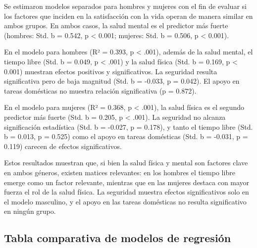 \documentclass[
  spanish,
  a4paper,
  oneside]{scrbook}
\begin{document}
Se estimaron modelos separados para hombres y mujeres con el fin de
evaluar si los factores que inciden en la satisfacción con la vida
operan de manera similar en ambos grupos. En ambos casos, la salud
mental es el predictor más fuerte (hombres: Std. b = 0.542, p
\textless{} 0.001; mujeres: Std. b = 0.506, p \textless{} 0.001).

En el modelo para hombres (R² = 0.393, p \textless{} .001), además de la
salud mental, el tiempo libre (Std. b = 0.049, p \textless{} .001) y la
salud física (Std. b = 0.169, p \textless{} 0.001) muestran efectos
positivos y significativos. La seguridad resulta significativa pero de
baja magnitud (Std. b = -0.033, p = 0.042). El apoyo en tareas
domésticas no muestra relación significativa (p = 0.872).

En el modelo para mujeres (R² = 0.368, p \textless{} .001), la salud
física es el segundo predictor más fuerte (Std. b = 0.205, p \textless{}
.001). La seguridad no alcanza significación estadística (Std. b =
-0.027, p = 0.178), y tanto el tiempo libre (Std. b = 0.013, p = 0.525)
como el apoyo en tareas domésticas (Std. b = -0.031, p = 0.119) carecen
de efectos significativos.

Estos resultados muestran que, si bien la salud física y mental son
factores clave en ambos géneros, existen matices relevantes: en los
hombres el tiempo libre emerge como un factor relevante, mientras que en
las mujeres destaca con mayor fuerza el rol de la salud física. La
seguridad muestra efectos significativos solo en el modelo masculino, y
el apoyo en las tareas domésticas no resulta significativo en ningún
grupo.

\subsection{Tabla comparativa de modelos de
regresión}\label{tabla-comparativa-de-modelos-de-regresiuxf3n}
\end{document}
